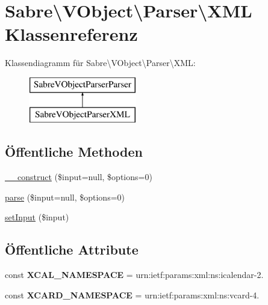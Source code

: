 \hypertarget{class_sabre_1_1_v_object_1_1_parser_1_1_x_m_l}{}\section{Sabre\textbackslash{}V\+Object\textbackslash{}Parser\textbackslash{}X\+ML Klassenreferenz}
\label{class_sabre_1_1_v_object_1_1_parser_1_1_x_m_l}
Klassendiagramm für Sabre\textbackslash{}V\+Object\textbackslash{}Parser\textbackslash{}X\+ML\+:\begin{figure}[H]
\begin{center}
\leavevmode
\includegraphics[height=2.000000cm]{class_sabre_1_1_v_object_1_1_parser_1_1_x_m_l}
\end{center}
\end{figure}
\subsection*{Öffentliche Methoden}
\begin{DoxyCompactItemize}
\item 
\mbox{\hyperlink{class_sabre_1_1_v_object_1_1_parser_1_1_x_m_l_a9a69f42e42441fe60d93b0f42628188b}{\+\_\+\+\_\+construct}} (\$input=null, \$options=0)
\item 
\mbox{\hyperlink{class_sabre_1_1_v_object_1_1_parser_1_1_x_m_l_a45dd53da3166c19ffd1a3184bb60f578}{parse}} (\$input=null, \$options=0)
\item 
\mbox{\hyperlink{class_sabre_1_1_v_object_1_1_parser_1_1_x_m_l_a1a3a2e8b6a10cfc161c03acef9ed712c}{set\+Input}} (\$input)
\end{DoxyCompactItemize}
\subsection*{Öffentliche Attribute}
\begin{DoxyCompactItemize}
\item 
\mbox{\label{class_sabre_1_1_v_object_1_1_parser_1_1_x_m_l_a2b53b487973e0268e0800bd435d17815}} 
const {\bfseries X\+C\+A\+L\+\_\+\+N\+A\+M\+E\+S\+P\+A\+CE} = \textquotesingle{}urn\+:ietf\+:params\+:xml\+:ns\+:icalendar-\/2.\textquotesingle{}
\item 
\mbox{\label{class_sabre_1_1_v_object_1_1_parser_1_1_x_m_l_ab2d921c027fb821ce2a9848600c7eeb2}} 
const {\bfseries X\+C\+A\+R\+D\+\_\+\+N\+A\+M\+E\+S\+P\+A\+CE} = \textquotesingle{}urn\+:ietf\+:params\+:xml\+:ns\+:vcard-\/4.\textquotesingle{}
\end{DoxyCompactItemize}
